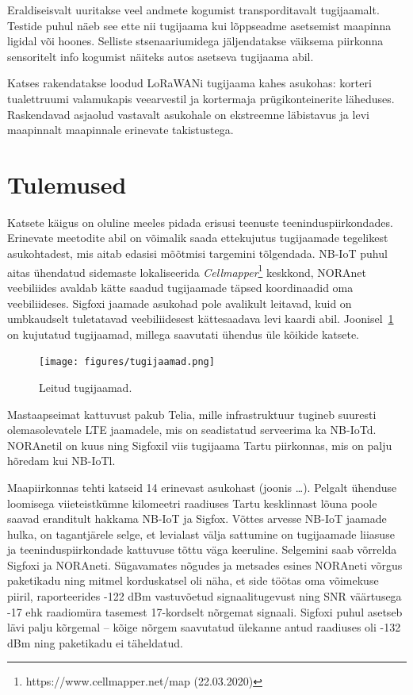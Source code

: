 \documentclass[12pt]{article}
\begin{document}
Eraldiseisvalt uuritakse veel andmete kogumist transporditavalt tugijaamalt.
Testide puhul näeb see ette nii tugijaama kui lõppseadme asetsemist maapinna ligidal või hoones.
Selliste stsenaariumidega jäljendatakse väiksema piirkonna sensoritelt info kogumist näiteks autos asetseva tugijaama abil.

Katses rakendatakse loodud LoRaWANi tugijaama kahes asukohas: korteri tualettruumi valamukapis veearvestil ja kortermaja prügikonteinerite läheduses.
Raskendavad asjaolud vastavalt asukohale on ekstreemne läbistavus ja levi maapinnalt maapinnale erinevate takistustega.

\newpage
\section{Tulemused}

Katsete käigus on oluline meeles pidada erisusi teenuste teeninduspiirkondades.
Erinevate meetodite abil on võimalik saada ettekujutus tugijaamade tegelikest asukohtadest, mis aitab edasisi mõõtmisi targemini tõlgendada.
NB-IoT puhul aitas ühendatud sidemaste lokaliseerida \textit{Cellmapper}\footnote{https://www.cellmapper.net/map (22.03.2020)} keskkond, NORAnet veebiliides avaldab kätte saadud tugijaamade täpsed koordinaadid oma veebiliideses.
Sigfoxi jaamade asukohad pole avalikult leitavad, kuid on umbkaudselt tuletatavad veebiliidesest kättesaadava levi kaardi abil.
Joonisel~\ref{fig:tugijaamad} on kujutatud tugijaamad, millega saavutati ühendus üle kõikide katsete.

\begin{figure} [ht]
    \begin{center}
        \texttt{[image: figures/tugijaamad.png]}
        \caption{Leitud tugijaamad.}
        \label{fig:tugijaamad}
    \end{center}
\end{figure}

Mastaapseimat kattuvust pakub Telia, mille infrastruktuur tugineb suuresti olemasolevatele LTE jaamadele, mis on seadistatud serveerima ka NB-IoTd.
NORAnetil on kuus ning Sigfoxil viis tugijaama Tartu piirkonnas, mis on palju hõredam kui NB-IoTl.

Maapiirkonnas tehti katseid 14 erinevast asukohast (joonis \ldots). Pelgalt ühenduse loomisega viieteistkümne kilomeetri raadiuses Tartu kesklinnast lõuna poole saavad eranditult hakkama NB-IoT ja Sigfox.
Võttes arvesse NB-IoT jaamade hulka, on tagantjärele selge, et levialast välja sattumine on tugijaamade liiasuse ja teeninduspiirkondade kattuvuse tõttu väga keeruline.
Selgemini saab võrrelda Sigfoxi ja NORAneti.
Sügavamates nõgudes ja metsades esines NORAneti võrgus paketikadu ning mitmel korduskatsel oli näha, et side töötas oma võimekuse piiril, raporteerides -122 dBm vastuvõetud signaalitugevust ning SNR väärtusega -17 ehk raadiomüra tasemest 17-kordselt nõrgemat signaali.
Sigfoxi puhul asetseb lävi palju kõrgemal -- kõige nõrgem saavutatud ülekanne antud raadiuses oli -132 dBm ning paketikadu ei täheldatud.
\end{document}
